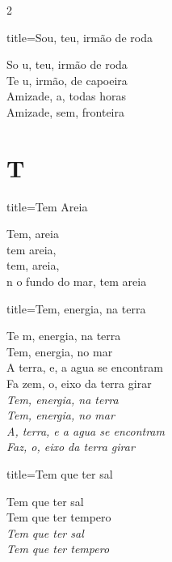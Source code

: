\documentclass[fontsize=14pt, paper=a4, twoside, DIV=20]{scrreprt} %
\newcommand\chapTOC[1]{
    \chapter*{#1}
    \addcontentsline{toc}{chapter}{#1}
    \markboth{#1}{#1}}
\begin{document}
\begin{multicols*}{2}
\begin{song}{title={Sou, teu, irmão de roda}}
        \begin{verse*}
            So u, teu, irmão de roda\\
            Te u, irmão, de capoeira\\
            Amizade, a, todas horas\\
            Amizade, sem, fronteira\\
        \end{verse*}
\end{song}

\chapTOC{T}

\begin{song}{title={Tem Areia}}
        \begin{verse*}
            Tem, areia\\
            tem areia,\\
            tem, areia,\\
            n o fundo do mar, tem areia\\
        \end{verse*}
\end{song}

\begin{song}{title={Tem, energia, na terra}}
        \begin{verse*}
            Te m, energia, na terra\\
            Tem, energia, no mar\\
            A terra, e, a agua se encontram\\
            Fa zem, o, eixo da terra girar\\
            \textit{Tem, energia, na terra}\\
            \textit{Tem, energia, no mar}\\
            \textit{A, terra, e a agua se encontram}\\
            \textit{Faz, o, eixo da terra girar}\\
        \end{verse*}
\end{song}

\begin{song}{title={Tem que ter sal}}
        \begin{verse*}
            Tem que ter sal\\
            Tem que ter tempero \\
            \textit{Tem que ter sal\\
            Tem que ter tempero}
        \end{verse*}
\end{song}


\end{multicols*}
\end{document}
